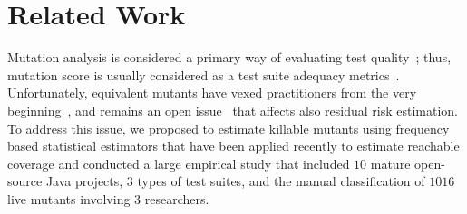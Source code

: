 \documentclass[sigconf,review,anonymous]{acmart}
\begin{document}
\section{Related Work}


Mutation analysis is considered a primary way of evaluating test quality~\cite{papadakis2019mutation};
thus, mutation score is usually considered as a test suite adequacy metrics~\cite{just2014are,andrews2005is,andrews2006using,daran1996software}. 
Unfortunately, equivalent mutants have vexed practitioners from the very beginning~\cite{budd1982two},
and remains an open issue~\cite{madeyski2014overcoming} that affects also residual risk estimation.
%
To address this issue, we proposed to estimate killable mutants using
frequency based statistical estimators that have been applied recently to 
estimate reachable coverage
and conducted a large empirical study that included
$10$ mature open-source Java projects, $3$ types of test suites, and the 
manual classification of $1016$ live mutants involving $3$ researchers.
\end{document}
